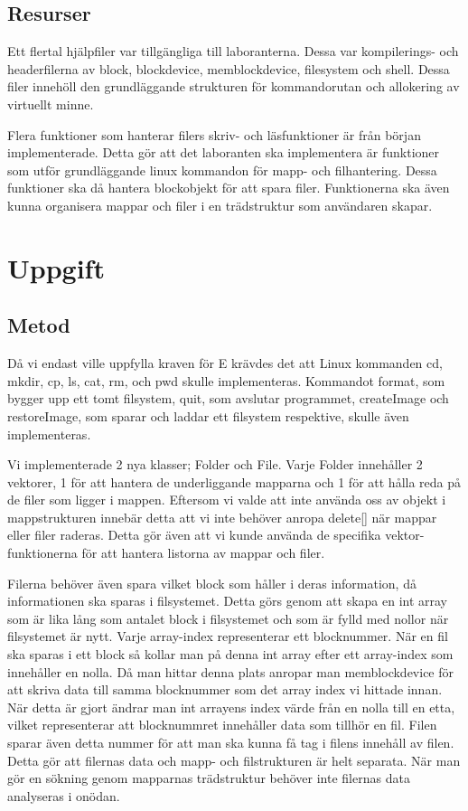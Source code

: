 \documentclass[a4paper,11pt]{article}
\begin{document}
\subsection{Resurser}
Ett flertal hjälpfiler var tillgängliga till laboranterna. Dessa var kompilerings- och headerfilerna av block, blockdevice, memblockdevice, filesystem och shell. Dessa filer innehöll den grundläggande strukturen för kommandorutan och allokering av virtuellt minne. 

Flera funktioner som hanterar filers skriv- och läsfunktioner är från början implementerade. Detta gör att det laboranten ska implementera är funktioner som utför grundläggande linux kommandon för mapp- och filhantering. Dessa funktioner ska då hantera blockobjekt för att spara filer. Funktionerna ska även kunna organisera mappar och filer i en trädstruktur som användaren skapar.

\section{Uppgift}
\subsection{Metod}
Då vi endast ville uppfylla kraven för E krävdes det att Linux kommanden cd, mkdir, cp, ls, cat, rm, och pwd skulle implementeras. Kommandot format, som bygger upp ett tomt filsystem, quit, som avslutar programmet, createImage och restoreImage, som sparar och laddar ett filsystem respektive, skulle även implementeras.

Vi implementerade 2 nya klasser; Folder och File. Varje Folder innehåller 2 vektorer, 1 för att hantera de underliggande mapparna och 1 för att hålla reda på de filer som ligger i mappen. Eftersom vi valde att inte använda oss av objekt i mappstrukturen innebär detta att vi inte behöver anropa delete[] när mappar eller filer raderas. Detta gör även att vi kunde använda de specifika vektor-funktionerna för att hantera listorna av mappar och filer. 

Filerna behöver även spara vilket block som håller i deras information, då informationen ska sparas i filsystemet. Detta görs genom att skapa en int array som är lika lång som antalet block i filsystemet och som är fylld med nollor när filsystemet är nytt. Varje array-index representerar ett blocknummer. När en fil ska sparas i ett block så kollar man på denna int array efter ett array-index som innehåller en nolla. Då man hittar denna plats anropar man memblockdevice för att skriva data till samma blocknummer som det array index vi hittade innan. När detta är gjort ändrar man int arrayens index värde från en nolla till en etta, vilket representerar att blocknummret innehåller data som tillhör en fil. Filen sparar även detta nummer för att man ska kunna få tag i filens innehåll av filen. Detta gör att filernas data och mapp- och filstrukturen är helt separata. När man gör en sökning genom mapparnas trädstruktur behöver inte filernas data analyseras i onödan.
\end{document}
